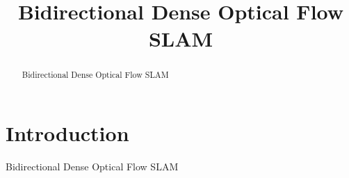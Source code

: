 \documentclass{article}
\title { Bidirectional Dense Optical Flow SLAM }
\begin{document}
\maketitle

\begin{abstract}
Bidirectional Dense Optical Flow SLAM
\end{abstract}

\section{Introduction}
Bidirectional Dense Optical Flow SLAM
\end{document}
